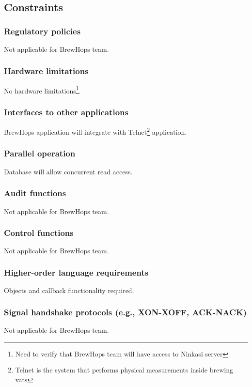 \documentclass[draftclsnofoot,onecolumn,letterpaper,10pt,compsoc]{IEEEtran}
\begin{document}
	\subsection{Constraints}
		\subsubsection{Regulatory policies}
        Not applicable for BrewHops team.
        
		\subsubsection{Hardware limitations}
        No hardware limitations\footnote{Need to verify that BrewHops team will have access to Ninkasi server}.
        
		\subsubsection{Interfaces to other applications}
        BrewHops application will integrate with Telnet\footnote{Telnet is the system that performs physical measurements inside brewing vats} application.
        
		\subsubsection{Parallel operation}
        Database will allow concurrent read access.
        
		\subsubsection{Audit functions}
        Not applicable for BrewHops team.
        
		\subsubsection{Control functions}
        Not applicable for BrewHops team.
        
		\subsubsection{Higher-order language requirements}
        Objects and callback functionality required.
        
		\subsubsection{Signal handshake protocols (e.g., XON-XOFF, ACK-NACK)}
        Not applicable for BrewHops team.
        
\end{document}
